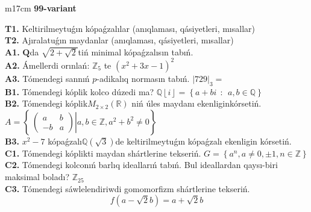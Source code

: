 \documentclass{article}
\begin{document}
\begin{tabular}{m{17cm}}
\textbf{99-variant}
\newline

\textbf{T1.} Keltirilmeytuǵın kópaǵzalılar (anıqlaması, qásiyetleri, mısallar) \\
\textbf{T2.} Ajıralatuǵın maydanlar (anıqlaması, qásiyetleri, mısallar) \\
\textbf{A1.} \(\mathbf{Q}\)da \(\sqrt{2 + \sqrt{2}}\)tiń minimal kópaǵzalısın tabıń. \\
\textbf{A2.} Ámellerdi orınlań: \(\mathbb{Z}_{5}\) te \(\left( x^{2} + 3x - 1 \right)^{2}\) \\
\textbf{A3.} Tómendegi sannıń \(p\)-adikalıq normasın tabıń. \(|729|_{3} =\) \\
\textbf{B1.} Tómendegi kóplik kolco dúzedi ma? \(\mathbb{Q}\left\lfloor i \right\rfloor = \left\{ a + bi\ \ :\ \ a,b\mathbb{\in Q} \right\}\) \\
\textbf{B2.} Tómendegi kóplik\(M_{2 \times 2}\left( \mathbb{R} \right)\) niń úles maydanı ekenliginkórsetiń. \(A = \left\{ \left. \ \begin{pmatrix}
a & b \\
 - b & a
\end{pmatrix} \right|a,b\mathbb{\in Z},a^{2} + b^{2} \neq 0 \right\}\) \\
\textbf{B3.} \(x^{2} - 7\) kópaǵzalı\(\mathbb{Q}(\sqrt{3})\)de keltirilmeytuǵın kópaǵzalı ekenligin kórsetiń. \\
\textbf{C1.} Tómendegi kóplikti maydan shártlerine tekseriń. \(G = \left\{ a^{n},a \neq 0, \pm 1,n \in \mathbb{Z} \right\}\) \\
\textbf{C2.} Tómendegi kolconıń barlıq ideallarıń tabıń. Bul ideallardan qaysı-biri maksimal boladı? \(\mathbb{Z}_{25}\) \\
\textbf{C3.} Tómendegi sáwlelendiriwdi gomomorfizm shártlerine tekseriń.
\[f\left( a - \sqrt{2}b \right) = a + \sqrt{2}b\] \\

\end{tabular}
\vspace{1cm}
\end{document}
